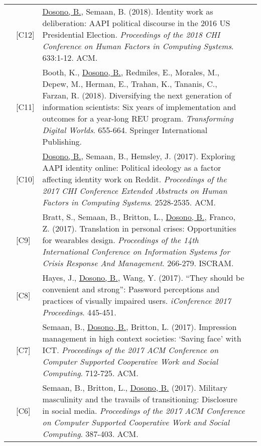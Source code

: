 \documentclass[12pt]{article}
\begin{document}
{{\begin{longtable}{Rp{1.0in}p{0.25in}p{4.75in}}
& \footnotesize{[C12]} & \href{https://dl.acm.org/authorize?N658208}{{Dosono, B.}}, Semaan, B. (2018). Identity work as deliberation: AAPI political discourse in the 2016 US Presidential Election. \textit{Proceedings of the 2018 CHI Conference on Human Factors in Computing Systems}. 633:1-12. ACM. \\

& \footnotesize{[C11]} & Booth, K., \href{https://doi.org/10.1007/978-3-319-78105-1_75}{{Dosono, B.}}, Redmiles, E., Morales, M., Depew, M., Herman, E., Trahan, K., Tananis, C., Farzan, R. (2018). Diversifying the next generation of information scientists: Six years of implementation and outcomes for a year-long REU program. \textit{Transforming Digital Worlds}. 655-664. Springer International Publishing. \\

& \footnotesize{[C10]} & \href{https://dl.acm.org/authorize?N41342}{{Dosono, B.}}, Semaan, B., Hemsley, J. (2017). Exploring AAPI identity online: Political ideology as a factor affecting identity work on Reddit. \textit{Proceedings of the 2017 CHI Conference Extended Abstracts on Human Factors in Computing Systems}. 2528-2535. ACM. \\

& \footnotesize{[C9]} & Bratt, S., Semaan, B., Britton, L., \href{http://idl.iscram.org/show.php?record=1463}{{Dosono, B.}}, Franco, Z. (2017). Translation in personal crises: Opportunities for wearables design. \textit{Proceedings of the 14th International Conference on Information Systems for Crisis Response And Management}. 266-279. ISCRAM. \\

& \footnotesize{[C8]} & Hayes, J., \href{http://hdl.handle.net/2142/96755}{{Dosono, B.}}, Wang, Y. (2017). ``They should be convenient and strong'': Password perceptions and practices of visually impaired users. \textit{iConference 2017 Proceedings}. 445-451. \\

& \footnotesize{[C7]} & Semaan, B., \href{https://dl.acm.org/authorize?N41343}{{Dosono, B.}}, Britton, L. (2017). Impression management in high context societies: `Saving face' with ICT. \textit{Proceedings of the 2017 ACM Conference on Computer Supported Cooperative Work and Social Computing}. 712-725. ACM. \\

& \footnotesize{[C6]} & Semaan, B., Britton, L., \href{https://dl.acm.org/authorize?N41344}{{Dosono, B.}} (2017). Military masculinity and the travails of transitioning: Disclosure in social media. \textit{Proceedings of the 2017 ACM Conference on Computer Supported Cooperative Work and Social Computing}. 387-403. ACM. \\


\end{longtable}}}
\end{document}
